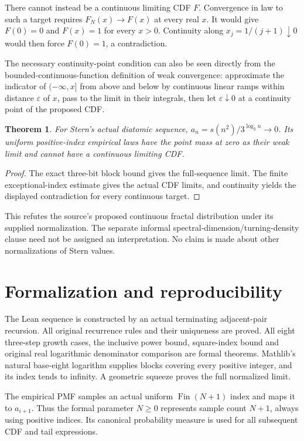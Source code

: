 \documentclass[11pt]{article}
\newtheorem{theorem}{Theorem}
\begin{document}
There cannot instead be a continuous limiting CDF
$F$. Convergence in law to such a target requires
$F_N(x)\to F(x)$ at every real $x$. It would give
$F(0)=0$ and $F(x)=1$ for every $x>0$. Continuity
along $x_j=1/(j+1)\downarrow0$ would then force
$F(0)=1$, a contradiction.

The necessary continuity-point condition can also
be seen directly from the bounded-continuous-function
definition of weak convergence: approximate the
indicator of $(-\infty,x]$ from above and below
by continuous linear ramps within distance
$\varepsilon$ of $x$, pass to the limit in their
integrals, then let $\varepsilon\downarrow0$ at a
continuity point of the proposed CDF.

\begin{theorem}
For Stern's actual diatomic sequence,
$a_n=s(n^2)/3^{\log_2n}\to0$. Its uniform positive-index
empirical laws have the point mass at zero as their
weak limit and cannot have a continuous limiting CDF.
\end{theorem}
\begin{proof}
The exact three-bit block bound gives the full-sequence
limit. The finite exceptional-index estimate gives
the actual CDF limits, and continuity yields the
displayed contradiction for every continuous target.
\end{proof}
This refutes the source's proposed continuous fractal
distribution under its supplied normalization.
The separate informal spectral-dimension/turning-density
clause need not be assigned an interpretation.
No claim is made about other normalizations of Stern values.

\newpage
\section*{Formalization and reproducibility}
The Lean sequence is constructed by an actual
terminating adjacent-pair recursion. All original
recurrence rules and their uniqueness are proved.
All eight three-step growth cases, the inclusive
power bound, square-index bound and original real
logarithmic denominator comparison are formal theorems.
Mathlib's natural base-eight logarithm supplies blocks
covering every positive integer, and its index tends
to infinity. A geometric squeeze proves the full
normalized limit.

The empirical PMF samples an actual uniform
$\operatorname{Fin}(N+1)$ index and maps it to
$a_{i+1}$. Thus the formal parameter $N\geq0$
represents sample count $N+1$, always using positive
indices. Its canonical probability measure is used
for all subsequent CDF and tail expressions.
\end{document}
